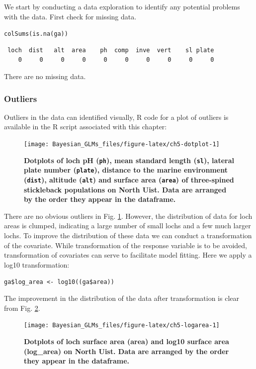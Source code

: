 \documentclass[
]{book}
\begin{document}
We start by conducting a data exploration to identify any potential problems with the data. First check for missing data.

\texttt{colSums(is.na(ga))}

\begin{verbatim}
 loch  dist   alt  area    ph  comp  inve  vert    sl plate 
    0     0     0     0     0     0     0     0     0     0 
\end{verbatim}

There are no missing data.

\hypertarget{ga-outliers}{%
\subsubsection{Outliers}\label{ga-outliers}}

Outliers in the data can identified visually, R code for a plot of outliers is available in the R script associated with this chapter:



\begin{figure}

{\centering \texttt{[image: Bayesian\_GLMs\_files/figure-latex/ch5-dotplot-1]} 

}

\caption{\textbf{Dotplots of loch pH (\texttt{ph}), mean standard length (\texttt{sl}), lateral plate number (\texttt{plate}), distance to the marine environment (\texttt{dist}), altitude (\texttt{alt}) and surface area (\texttt{area}) of three-spined stickleback populations on North Uist. Data are arranged by the order they appear in the dataframe.}}\label{fig:ch5-dotplot}
\end{figure}

There are no obvious outliers in Fig. \ref{fig:ch5-dotplot}. However, the distribution of data for loch areas is clumped, indicating a large number of small lochs and a few much larger lochs. To improve the distribution of these data we can conduct a transformation of the covariate. While transformation of the response variable is to be avoided, transformation of covariates can serve to facilitate model fitting. Here we apply a log10 transformation:

\texttt{ga\$log\_area\ \textless{}-\ log10((ga\$area))}

The improvement in the distribution of the data after transformation is clear from Fig. \ref{fig:ch5-logarea}.



\begin{figure}

{\centering \texttt{[image: Bayesian\_GLMs\_files/figure-latex/ch5-logarea-1]} 

}

\caption{\textbf{Dotplots of loch surface area (area) and log10 surface area (log\_area) on North Uist. Data are arranged by the order they appear in the dataframe.}}\label{fig:ch5-logarea}
\end{figure}
\end{document}
